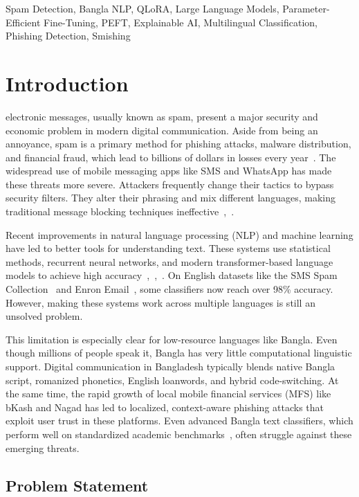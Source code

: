 \documentclass[journal]{IEEEtran}
\begin{document}
\begin{IEEEkeywords}
Spam Detection, Bangla NLP, QLoRA, Large Language Models, Parameter-Efficient Fine-Tuning, PEFT, Explainable AI, Multilingual Classification, Phishing Detection, Smishing
\end{IEEEkeywords}

\section{Introduction}

 electronic messages, usually known as spam, present a major security and economic problem in modern digital communication. Aside from being an annoyance, spam is a primary method for phishing attacks, malware distribution, and financial fraud, which lead to billions of dollars in losses every year~\cite{ref1}. The widespread use of mobile messaging apps like SMS and WhatsApp has made these threats more severe. Attackers frequently change their tactics to bypass security filters. They alter their phrasing and mix different languages, making traditional message blocking techniques ineffective~\cite{ref5},~\cite{ref6}.

Recent improvements in natural language processing (NLP) and machine learning have led to better tools for understanding text. These systems use statistical methods, recurrent neural networks, and modern transformer-based language models to achieve high accuracy~\cite{ref4},~\cite{ref7},~\cite{ref9}. On English datasets like the SMS Spam Collection~\cite{ref1} and Enron Email~\cite{ref9}, some classifiers now reach over 98\% accuracy. However, making these systems work across multiple languages is still an unsolved problem.

This limitation is especially clear for low-resource languages like Bangla. Even though millions of people speak it, Bangla has very little computational linguistic support. Digital communication in Bangladesh typically blends native Bangla script, romanized phonetics, English loanwords, and hybrid code-switching. At the same time, the rapid growth of local mobile financial services (MFS) like bKash and Nagad has led to localized, context-aware phishing attacks that exploit user trust in these platforms. Even advanced Bangla text classifiers, which perform well on standardized academic benchmarks~\cite{ref7}, often struggle against these emerging threats.

\subsection{Problem Statement}
\end{document}
